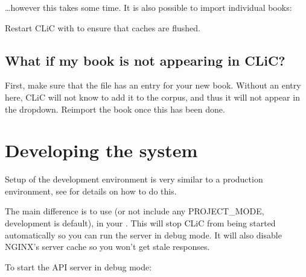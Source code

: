 \documentclass[letterpaper,10pt,english]{sphinxmanual}
\begin{document}
\sphinxAtStartPar
…however this takes some time. It is also possible to import
individual books:

\begin{sphinxVerbatim}[commandchars=\\\{\}]
 
\end{sphinxVerbatim}

\sphinxAtStartPar
Restart CLiC with  to ensure that caches are flushed.


\section{What if my book is not appearing in CLiC?}
\label{\detokenize{advanced/adding_corpora:what-if-my-book-is-not-appearing-in-clic}}
\sphinxAtStartPar
First, make sure that the  file has an entry for your new
book. Without an entry here, CLiC will not know to add it to the corpus,
and thus it will not appear in the drop\sphinxhyphen{}down. Re\sphinxhyphen{}import the book once
this has been done.

\sphinxstepscope


\chapter{Developing the system}
\label{\detokenize{advanced/development:developing-the-system}}\label{\detokenize{advanced/development::doc}}
\sphinxAtStartPar
Set\sphinxhyphen{}up of the development environment is very similar to a production
environment, see  for details on how to do this.

\sphinxAtStartPar
The main difference is to use  (or not include any
PROJECT\_MODE, development is default), in your . This will stop
CLiC from being started automatically so you can run the server in debug mode.
It will also disable NGINX’s server cache so you won’t get stale responses.

\sphinxAtStartPar
To start the API server in debug mode:

\begin{sphinxVerbatim}[commandchars=\\\{\}]
 
\end{sphinxVerbatim}
\end{document}
